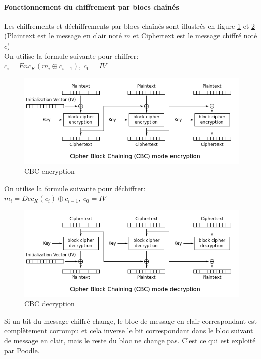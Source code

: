 \paragraph{Fonctionnement du chiffrement par blocs cha\^inés}

Les chiffrements et déchiffrements par blocs cha\^inés sont illustrés en figure \ref{cbc-enc} et \ref{cbc-dec} (Plaintext est le message en clair noté $m$ et Ciphertext est le message chiffré noté $c$) \\

\noindent On utilise la formule suivante pour chiffrer: \\
$c_i = Enc_K(m_i \oplus c_{i-1}),\ c_0 = IV$

\begin{figure}[H]
\centering
\includegraphics[scale=0.6]{img/cbc-enc.png}
\caption{CBC encryption}
\label{cbc-enc}
\end{figure}

\noindent On utilise la formule suivante pour déchiffrer: \\
$m_i = Dec_K(c_i) \oplus c_{i-1},\ c_0 = IV$ 

\begin{figure}[H]
\centering
\includegraphics[scale=0.6]{img/cbc-dec.png}
\caption{CBC decryption}
\label{cbc-dec}
\end{figure}

Si un bit du message chiffré change, le bloc de message en clair correspondant est complètement corrompu et cela inverse le bit correspondant dans le bloc suivant de message en clair, mais le reste du bloc ne change pas. C'est ce qui est exploité par Poodle.

